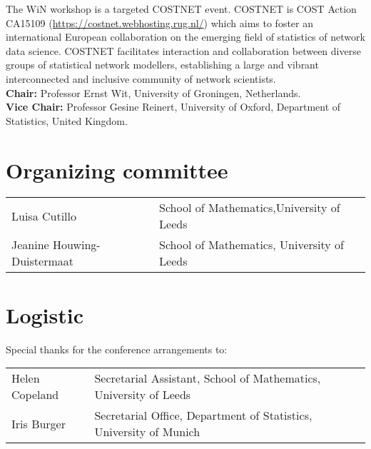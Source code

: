 The WiN workshop is a targeted COSTNET event. COSTNET is COST Action CA15109 (\url{https://costnet.webhosting.rug.nl/}) which aims to foster an international European collaboration on the emerging field of statistics of network data science. COSTNET facilitates interaction and collaboration between diverse groups of statistical network modellers, establishing a large and vibrant interconnected and inclusive community of network scientists. \\
\textbf{Chair:}
Professor Ernst Wit,
University of Groningen,
Netherlands. \\	
\textbf{Vice Chair:}
Professor Gesine Reinert,
University of Oxford,
Department of Statistics,
United Kingdom.



\section{Organizing committee}
\begin{center}
\begin{tabular}{ll}
Luisa Cutillo & School of Mathematics,University of Leeds\\
Jeanine Houwing-Duistermaat & School of Mathematics, University of Leeds


\end{tabular}
\end{center}
\section{Logistic}
Special thanks for the conference arrangements to:
\begin{center}
\begin{tabular}{ll}
Helen Copeland & Secretarial Assistant, School of Mathematics, University of Leeds\\
Iris Burger & Secretarial Office, Department of Statistics, University of Munich\\ 

\end{tabular}
\end{center}

